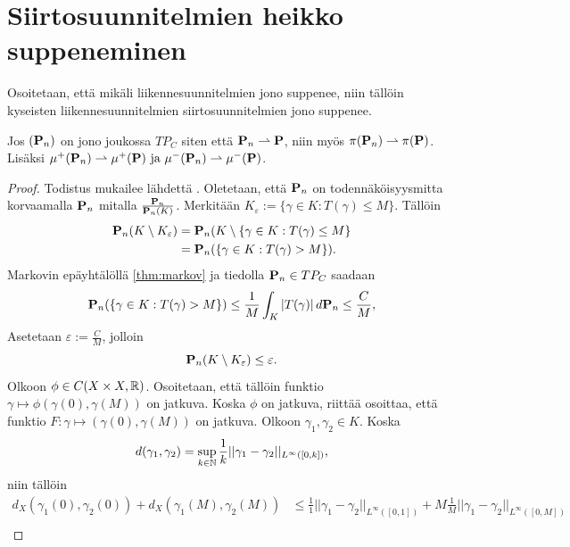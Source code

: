 \documentclass[12pt,oneside,a4paper]{amsbook} %
\begin{document}
\section{Siirtosuunnitelmien heikko suppeneminen}

Osoitetaan, että mikäli liikennesuunnitelmien jono suppenee, niin tällöin kyseisten liikennesuunnitelmien siirtosuunnitelmien jono suppenee.

\begin{theorem}\label{le:tfPlanWeakConv}
    Jos $(\P_n)$ on jono joukossa $TP_C$ siten että $\P_n \rightharpoonup \P$, niin myös $\pi(\P_n) \rightharpoonup \pi(\P)$. Lisäksi $\mu^+(\P_n) \rightharpoonup \mu^+(\P) \text{ ja }  \mu^-(\P_n) \rightharpoonup \mu^-(\P)$.
    
\end{theorem}
\begin{proof}
    Todistus mukailee lähdettä \cite[s. 33]{optimal}. Oletetaan, että $\P_n$ on todennäköisyysmitta korvaamalla $\P_n$ mitalla $\frac{\P_n}{\P_n(K)}$. Merkitään $K_\varepsilon := \{\gamma \in K : T(\gamma) \le M\}$. Tällöin
    \begin{align*}
        \P_n(K\setminus K_\varepsilon) &= \P_n(K\setminus\{\gamma \in K: T(\gamma) \le M\} \\
        &= \P_n(\{\gamma \in K : T(\gamma) > M\}).
    \end{align*}
    Markovin epäyhtälöllä \ref{thm:markov} ja tiedolla $\P_n \in TP_C$ saadaan 
    \begin{equation*}
        \P_n(\{\gamma \in K : T(\gamma) > M\}) \le \frac{1}{M}\int_K |T(\gamma)| \, d\P_n \le \frac{C}{M},
    \end{equation*}
    Asetetaan $\varepsilon := \frac{C}{M}$, jolloin
    \begin{equation*}
        \P_n(K\setminus K_\varepsilon) \le \varepsilon.
    \end{equation*}
    Olkoon $\phi \in C(X\times X, \R)$. Osoitetaan, että tällöin funktio $\gamma \mapsto \phi(\gamma(0), \gamma(M))$ on jatkuva. Koska $\phi$ on jatkuva, riittää osoittaa, että funktio $F: \gamma \mapsto (\gamma(0), \gamma(M))$ on jatkuva. Olkoon $\gamma_1, \gamma_2 \in K$. Koska
    \begin{equation*}
        d(\gamma_1, \gamma_2) = \sup_{k\in\N} \frac{1}{k}||\gamma_1-\gamma_2||_{L^\infty([0,k])},
    \end{equation*}
    niin tällöin
    \begin{align*}
        d_X(\gamma_1(0), \gamma_2(0)) + d_X(\gamma_1(M), \gamma_2(M)) &\le \frac{1}{1}||\gamma_1-\gamma_2||_{L^\infty([0,1])} + M\frac{1}{M}||\gamma_1-\gamma_2||_{L^\infty([0,M])} \\

\end{align*}
\end{proof}
\end{document}
